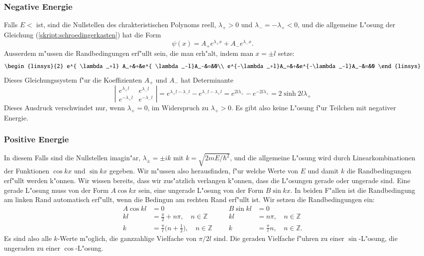 \subsubsection{Negative Energie}
Falls $E<$ ist, sind die Nullstellen des chrakteristischen
Polynoms reell, $\lambda_+>0$ und $\lambda_-=-\lambda_+ < 0$,
und die allgemeine 
L"osung der Gleichung (\ref{skript:schroedingerkasten}) hat die Form
\[
\psi(x)=A_+e^{\lambda_+x}+A_-e^{\lambda_-x}.
\]
Ausserdem m"ussen die Randbedingungen erf"ullt sein, die man erh"alt,
indem man $x=\pm l$ setze:
\[
\begin{linsys}{2}
e^{ \lambda_+l} A_+&+&e^{ \lambda_-l}A_-&=&0\\
e^{-\lambda_+l}A_+&+&e^{-\lambda_-l}A_-&=&0
\end{linsys}
\]
Dieses Gleichungssystem f"ur die Koeffizienten $A_+$ und $A_-$ hat
Determinante
\[
\left|\begin{matrix}
e^{ \lambda_+l}&e^{ \lambda_-l}\\
e^{-\lambda_+l}&e^{-\lambda_-l}
\end{matrix}\right|
=
e^{\lambda_+l-\lambda_-l}-e^{\lambda_-l-\lambda_+l}
=
e^{2l\lambda_+}-e^{-2l\lambda_+}
=
2\sinh 2l\lambda_+
\]
Dieses Ausdruck verschwindet nur, wenn $\lambda_+=0$, im Widerspruch
zu $\lambda_+>0$.
Es gibt also keine L"osung f"ur Teilchen mit negativer Energie.

\subsubsection{Positive Energie}
In diesem Falls sind die Nullstellen imagin"ar, $\lambda_\pm=\pm ik$
mit $k=\sqrt{2mE/\hbar^2}$,
und die allgemeine L"osung wird durch Linearkombinationen der Funktionen
$\cos kx$ und $\sin kx$ gegeben.
Wir m"ussen also herausfinden, f"ur welche Werte von $E$ und damit $k$
die Randbedingungen erf"ullt werden k"onnen.
Wir wissen bereits, dass wir zus"atzlich verlangen k"onnen, dass die
L"osungen gerade oder ungerade sind.
Eine gerade L"osung muss von der Form $A\cos kx$ sein, eine ungerade
L"osung von der Form $B\sin kx$.
In beiden F"allen ist die Randbedingung am linken Rand automatisch
erf"ullt, wenn die Bedingun am rechten Rand erf"ullt ist.
Wir setzen die Randbedingungen ein:
\begin{align*}
A\cos kl&=0
	&&&
		B\sin kl&=0\\
kl&=\frac{\pi}2+n\pi,\quad n\in\mathbb Z
	&&&
		kl&=n\pi,\quad n\in\mathbb Z\\
k&=\frac{\pi}{l}\biggl(n+\frac12\biggr),\quad n\in\mathbb Z
	&&&
		k&=\frac{\pi}{l}n,\quad n\in\mathbb Z.
\end{align*}
Es sind also alle $k$-Werte m"oglich, die ganzzahlige Vielfache von
$\pi/2l$ sind.
Die geraden Vielfache f"uhren zu einer $\sin$-L"osung, die ungeraden
zu einer $\cos$-L"osung.

